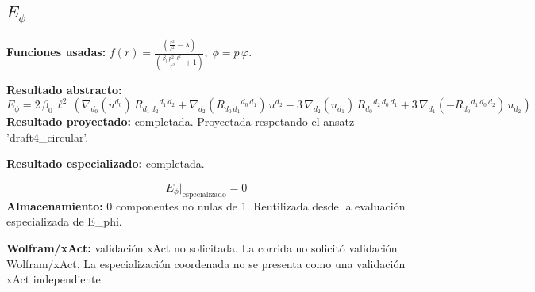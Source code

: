 \documentclass[11pt]{article}
\begin{document}
\subsection*{$ E_{\phi} $}
\textbf{Funciones usadas:} $ f\!\left(r\right) = \frac{\left(\frac{{r}^{2}}{{\ell}^{2}} - \lambda\right)}{\left(\frac{\beta_{0}\,{p}^{2}\,{\ell}^{2}}{{r}^{2}} + 1\right)},\;\phi=p\,\varphi $.\par
\textbf{Resultado abstracto:}
\begin{dmath*}[breakdepth={5}]
E_{\phi} = 2\,\beta_{0}\,{\ell}^{2}\,\left(\nabla_{d_{0}}\!\left(u{}^{d_{0}}\right)\,R{}_{d_{1}\,d_{2}}{}^{d_{1}\,d_{2}} + \nabla_{d_{2}}\!\left(R{}_{d_{0}\,d_{1}}{}^{d_{0}\,d_{1}}\right)\,u{}^{d_{2}} - 3\,\nabla_{d_{2}}\!\left(u{}_{d_{1}}\right)\,R{}_{d_{0}}{}^{d_{2}\,d_{0}\,d_{1}} + 3\,\nabla_{d_{1}}\!\left(-R{}_{d_{0}}{}^{d_{1}\,d_{0}\,d_{2}}\right)\,u{}_{d_{2}}\right)
\end{dmath*}
\textbf{Resultado proyectado:} completada. Proyectada respetando el ansatz 'draft4\_circular'.\par
\textbf{Resultado especializado:} completada.\par
\begin{dmath*}[breakdepth={5}]
E_{\phi}\big|_{\mathrm{especializado}} = 0
\end{dmath*}
\textbf{Almacenamiento:} 0 componentes no nulas de 1. Reutilizada desde la evaluación especializada de E\_phi.\par
\textbf{Wolfram/xAct:} validación xAct no solicitada. La corrida no solicitó validación Wolfram/xAct. La especialización coordenada no se presenta como una validación xAct independiente.\par\medskip
{}
\end{document}
